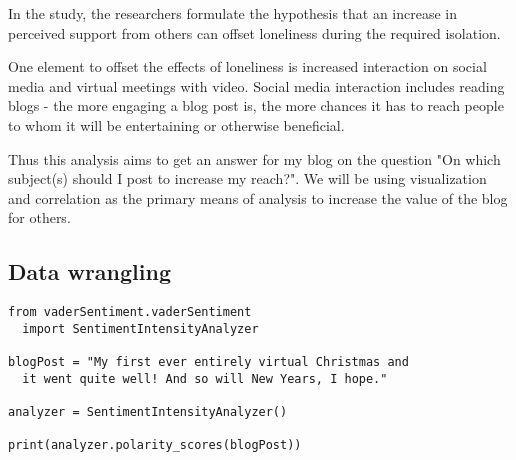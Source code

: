 In the study, the researchers formulate the hypothesis that an increase in perceived support from others can offset loneliness during the required isolation.

One element to offset the effects of loneliness is increased interaction on social media and virtual meetings with video. Social media interaction includes reading blogs - the more engaging a blog post is, the more chances it has to reach people to whom it will be entertaining or otherwise beneficial.

Thus this analysis aims to get an answer for my blog on the question "On which subject(s) should I post to increase my reach?". We will be using visualization and correlation as the primary means of analysis to increase the value of the blog for others.

\subsection{Data wrangling}

\begin{lstlisting}[caption=Vader Example, frame=single, basicstyle=\ttfamily]
from vaderSentiment.vaderSentiment 
  import SentimentIntensityAnalyzer

blogPost = "My first ever entirely virtual Christmas and 
  it went quite well! And so will New Years, I hope."

analyzer = SentimentIntensityAnalyzer()

print(analyzer.polarity_scores(blogPost))

\end{lstlisting}


